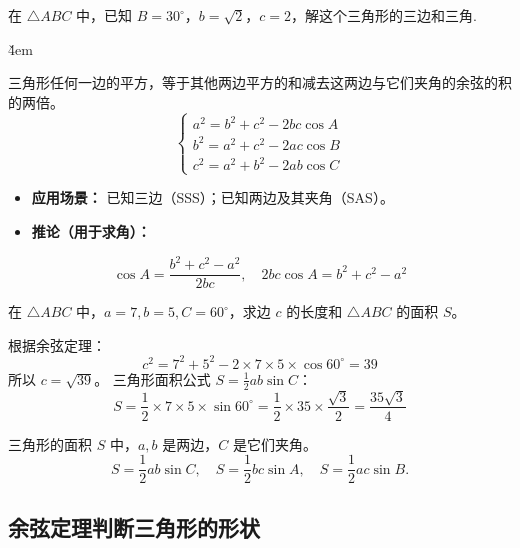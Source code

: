 \begin{example}
    在 $\triangle ABC$ 中，已知 $B=30^\circ$，$b=\sqrt{2}$，$c=2$，解这个三角形的三边和三角.
\end{example}

\v{4em}

\begin{theorem}[余弦定理]
    三角形任何一边的平方，等于其他两边平方的和减去这两边与它们夹角的余弦的积的两倍。
    $$
        \begin{cases}
            a^2 = b^2 + c^2 - 2bc \cos A \\
            b^2 = a^2 + c^2 - 2ac \cos B \\
            c^2 = a^2 + b^2 - 2ab \cos C
        \end{cases}
    $$
    \begin{itemize}
        \item \textbf{应用场景：} 已知三边（SSS）；已知两边及其夹角（SAS）。
        \item \textbf{推论（用于求角）：}
    \end{itemize}
    $$
        \cos A = \frac{b^2 + c^2 - a^2}{2bc}, \quad 2bc \cos A = b^2 + c^2 - a^2
    $$
\end{theorem}

\begin{example}
    在 $\triangle ABC$ 中，$a=7, b=5, C=60^\circ$，求边 $c$ 的长度和 $\triangle ABC$ 的面积 $S$。
\end{example}
\begin{solution}
    根据余弦定理：
    $$
        c^2 = 7^2 + 5^2 - 2 \times 7 \times 5 \times \cos 60^\circ = 39
    $$
    所以 $c = \sqrt{39}$。
    三角形面积公式 $S = \frac{1}{2}ab \sin C$：
    $$
        S = \frac{1}{2} \times 7 \times 5 \times \sin 60^\circ = \frac{1}{2} \times 35 \times \frac{\sqrt{3}}{2} = \frac{35\sqrt{3}}{4}
    $$
\end{solution}

\begin{theorem}[三角形面积公式]
    三角形的面积 $S$ 中，$a, b$ 是两边，$C$ 是它们夹角。
    $$
        S = \frac{1}{2}ab \sin C, \quad S = \frac{1}{2}bc \sin A, \quad S = \frac{1}{2}ac \sin B.
    $$

\end{theorem}

\subsection{余弦定理判断三角形的形状}

